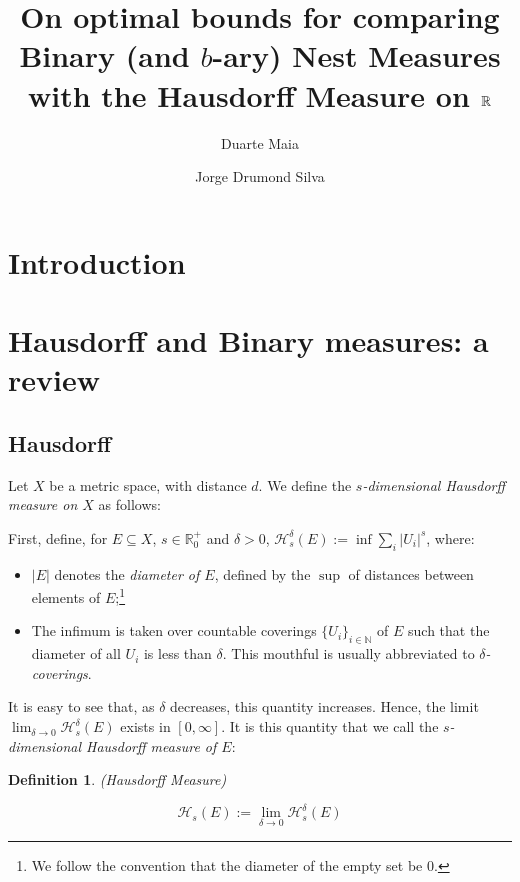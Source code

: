 \documentclass[11pt]{amsart}
\title[\textbf{Optimal bounds for $b$-ary measures}]{\textbf{On optimal bounds for comparing Binary (and $b$-ary) Nest Measures with the Hausdorff Measure on $\R$}}
\author{Duarte Maia}
\author{Jorge Drumond Silva}
\date{}
\newcommand{\R}{\mathbb{R}}
\newcommand{\N}{\mathbb{N}}
\newcommand{\HH}{\mathcal{H}}
\newtheorem{definition}{Definition}
\begin{document}
\begin{abstract}
\lipsum[1]
\end{abstract}

\maketitle


\section{Introduction}

\lipsum[1]

\section{Hausdorff and Binary measures: a review}

\subsection{Hausdorff}

Let $X$ be a metric space, with distance $d$. We define the \emph{$s$-dimensional Hausdorff measure on $X$} as follows:

First, define, for $E \subseteq X$, $s \in \R^+_0$ and $\delta > 0$, $\HH_s^\delta(E) := \inf \sum_i \lvert U_i \rvert^s$, where:

\begin{itemize}

\item $\lvert E \rvert$ denotes the \emph{diameter of $E$}, defined by the $\sup$ of distances between elements of $E$;\footnote{We follow the convention that the diameter of the empty set be 0.}

\item The infimum is taken over countable coverings $\{U_i\}_{i \in \N}$ of $E$ such that the diameter of all $U_i$ is less than $\delta$. This mouthful is usually abbreviated to \emph{$\delta$-coverings}.

\end{itemize}

It is easy to see that, as $\delta$ decreases, this quantity increases. Hence, the limit $\lim_{\delta \to 0} \HH_s^\delta(E)$ exists in $\left[ 0, \infty \right]$. It is this quantity that we call the \emph{$s$-dimensional Hausdorff measure of $E$}:

\begin{definition}(Hausdorff Measure)

 \[\HH_s(E) := \lim_{\delta \to 0} \HH_s^\delta(E)\]
\end{definition}
\end{document}

